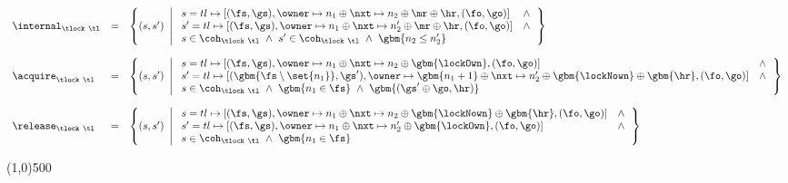 \begin{figure*}

\vspace{-17pt}

\[
\begin{array}{lcl}
\internal_{\tlock~\tl} & = &
\left\{ 
(s, s') ~\left|~ 
\begin{array}{ll}
    s = tl \mapsto [(\fs, \gs), \owner \mapsto n_1 \oplus \nxt
   \mapsto n_2 \oplus \mr \oplus \hr, (\fo, \go)] & \wedge \\
    s' = tl \mapsto [(\fs, \gs), \owner \mapsto n_1 \oplus \nxt
   \mapsto n'_2 \oplus \mr \oplus \hr, (\fo, \go)]  & \wedge \\
    s \in \coh_{\tlock~\tl} ~\wedge~ s' \in \coh_{\tlock~\tl}
   ~\wedge~ \gbm{ n_2 \le n'_2 }
\end{array} \right. \right\}
\\ \\
\acquire_{\tlock~\tl} & = &
\left\{ 
(s, s') ~\left|~ 
\begin{array}{ll}
    s = tl \mapsto [(\fs, \gs), \owner \mapsto n_1 \oplus \nxt
   \mapsto n_2 \oplus \gbm{\lockOwn}, (\fo, \go)] & \wedge \\
    s' = tl \mapsto [(\gbm{ \fs \setminus \set{n_1}}, \gs'), \owner \mapsto
    \gbm{ n_1 + 1 } \oplus \nxt
   \mapsto n'_2 \oplus \gbm{\lockNown} \oplus \gbm{\hr}, (\fo, \go)]  & \wedge \\
    s \in \coh_{\tlock~\tl} ~\wedge~ \gbm{ n_1 \in \fs } ~\wedge~
    \gbm{ (\gs' \oplus \go, \hr) }
\end{array}  
\right. \right\}
\\ \\
\release_{\tlock~\tl} & = &
\left\{ 
(s, s') ~\left|~ 
\begin{array}{ll}
    s = tl \mapsto [(\fs, \gs), \owner \mapsto n_1 \oplus \nxt
   \mapsto n_2 \oplus \gbm{\lockNown} \oplus \gbm{\hr}, (\fo, \go)] & \wedge \\
    s' = tl \mapsto [(\fs, \gs), \owner \mapsto n_1 \oplus \nxt
   \mapsto n'_2 \oplus \gbm{\lockOwn}, (\fo, \go)]  & \wedge \\
    s \in \coh_{\tlock~\tl} ~\wedge~ \gbm{ n_1 \in \fs }
\end{array}  
\right. \right\}
\end{array}
\]

\line(1,0){500}
\vspace{5pt}

\vspace{-20pt}


\end{figure*}
